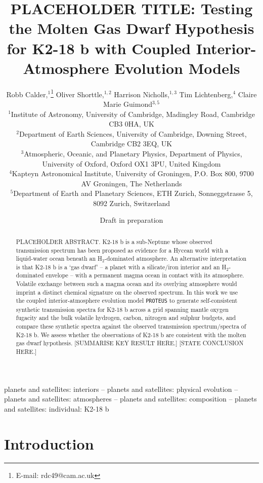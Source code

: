 \documentclass[fleqn,usenatbib]{mnras}
\title[The Molten Gas Dwarf Hypothesis for K2-18 b]{PLACEHOLDER TITLE: Testing the Molten Gas Dwarf Hypothesis for K2-18 b with Coupled Interior-Atmosphere Evolution Models}
\author[Robb Calder et al.]{
Robb Calder,$^{1}$\thanks{E-mail: rdc49@cam.ac.uk}
Oliver Shorttle,$^{1,2}$
Harrison Nicholls,$^{1,3}$
Tim Lichtenberg,$^{4}$
Claire Marie Guimond$^{3,5}$
\\
$^{1}$Institute of Astronomy, University of Cambridge, Madingley Road, Cambridge CB3 0HA, UK\\
$^{2}$Department of Earth Sciences, University of Cambridge, Downing Street, Cambridge CB2 3EQ, UK\\
$^{3}$Atmospheric, Oceanic, and Planetary Physics, Department of Physics, University of Oxford, Oxford OX1 3PU, United Kingdom\\
$^{4}$Kapteyn Astronomical Institute, University of Groningen, P.O. Box 800, 9700 AV Groningen, The Netherlands\\
$^{5}$Department of Earth and Planetary Sciences, ETH Zurich, Sonneggstrasse 5, 8092 Zurich, Switzerland\\
}
\date{Draft in preparation}
\begin{document}
\makeatletter
\renewcommand{\hyper@natlinkstart}[1]{}
\renewcommand{\hyper@natlinkend}{}
\renewcommand{\hyper@natlinkbreak}[2]{}
\makeatother
\label{firstpage}
\pagerange{\pageref{firstpage}--\pageref{lastpage}}
\maketitle

\begin{abstract}
PLACEHOLDER ABSTRACT. K2-18 b is a sub-Neptune whose observed transmission
spectrum has been proposed as evidence for a Hycean world with a liquid-water
ocean beneath an H$_2$-dominated atmosphere. An alternative interpretation is
that K2-18 b is a `gas dwarf' -- a planet with a silicate/iron interior and an
H$_2$-dominated envelope -- with a permanent magma ocean in contact with its
atmosphere. Volatile exchange between such a magma ocean and its overlying
atmosphere would imprint a distinct chemical signature on the observed
spectrum. In this work we use the coupled interior-atmosphere evolution model
\texttt{PROTEUS} to generate self-consistent synthetic transmission spectra
for K2-18 b across a grid spanning mantle oxygen fugacity and the bulk
volatile hydrogen, carbon, nitrogen and sulphur budgets, and compare these
synthetic spectra against the observed transmission spectrum/spectra of
K2-18 b. We assess whether the observations of K2-18 b are consistent with
the molten gas dwarf hypothesis. [SUMMARISE KEY RESULT HERE.] [STATE
CONCLUSION HERE.]
\end{abstract}

\begin{keywords}
planets and satellites: interiors -- planets and satellites: physical evolution -- planets and satellites: atmospheres -- planets and satellites: composition -- planets and satellites: individual: K2-18 b
\end{keywords}

\section{Introduction}
\label{sec:introduction}
\end{document}
